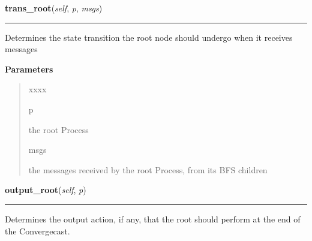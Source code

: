     \label{datk:core:algs:AsynchConvergecast:trans_root}

    \vspace{0.5ex}

\hspace{.8\funcindent}\begin{boxedminipage}{\funcwidth}

    \raggedright \textbf{trans\_root}(\textit{self}, \textit{p}, \textit{msgs})

    \vspace{-1.5ex}

    \rule{\textwidth}{0.5\fboxrule}
\setlength{\parskip}{2ex}
    Determines the state transition the root node should undergo when it 
    receives messages

\setlength{\parskip}{1ex}
      \textbf{Parameters}
      \vspace{-1ex}

      \begin{quote}
        \begin{Ventry}{xxxx}

          \item[p]

          the root Process

          \item[msgs]

          the messages received by the root Process, from its BFS children

        \end{Ventry}

      \end{quote}

    \end{boxedminipage}

    \label{datk:core:algs:AsynchConvergecast:output_root}

    \vspace{0.5ex}

\hspace{.8\funcindent}\begin{boxedminipage}{\funcwidth}

    \raggedright \textbf{output\_root}(\textit{self}, \textit{p})

    \vspace{-1.5ex}

    \rule{\textwidth}{0.5\fboxrule}
\setlength{\parskip}{2ex}
    Determines the output action, if any, that the root should perform at 
    the end of the Convergecast.

\setlength{\parskip}{1ex}
    \end{boxedminipage}

